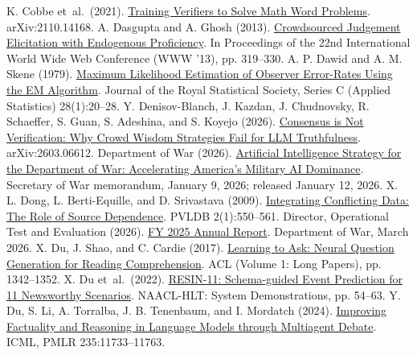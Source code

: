 \begin{thebibliography}{}
 K. Cobbe et~al.\ (2021). \href{https://arxiv.org/abs/2110.14168}{Training Verifiers to Solve Math Word Problems}. arXiv:2110.14168.
 A. Dasgupta and A. Ghosh (2013). \href{https://doi.org/10.1145/2488388.2488417}{Crowdsourced Judgement Elicitation with Endogenous Proficiency}. In Proceedings of the 22nd International World Wide Web Conference (WWW '13), pp. 319--330.
 A. P. Dawid and A. M. Skene (1979). \href{https://doi.org/10.2307/2346806}{Maximum Likelihood Estimation of Observer Error-Rates Using the EM Algorithm}. Journal of the Royal Statistical Society, Series C (Applied Statistics) 28(1):20--28.
 Y. Denisov-Blanch, J. Kazdan, J. Chudnovsky, R. Schaeffer, S. Guan, S. Adeshina, and S. Koyejo (2026). \href{https://arxiv.org/abs/2603.06612}{Consensus is Not Verification: Why Crowd Wisdom Strategies Fail for LLM Truthfulness}. arXiv:2603.06612.
 Department of War (2026). \href{https://www.war.gov/News/Releases/Release/Article/4376420/}{Artificial Intelligence Strategy for the Department of War: Accelerating America's Military AI Dominance}. Secretary of War memorandum, January 9, 2026; released January 12, 2026.
 X. L. Dong, L. Berti-Equille, and D. Srivastava (2009). \href{https://doi.org/10.14778/1687627.1687689}{Integrating Conflicting Data: The Role of Source Dependence}. PVLDB 2(1):550--561.
 Director, Operational Test and Evaluation (2026). \href{https://www.dote.osd.mil/Portals/97/pub/reports/FY2025/Other/2025Annual-Report.pdf}{FY 2025 Annual Report}. Department of War, March 2026.
 X. Du, J. Shao, and C. Cardie (2017). \href{https://doi.org/10.18653/v1/P17-1123}{Learning to Ask: Neural Question Generation for Reading Comprehension}. ACL (Volume 1: Long Papers), pp. 1342--1352.
 X. Du et~al.\ (2022). \href{https://doi.org/10.18653/v1/2022.naacl-demo.7}{RESIN-11: Schema-guided Event Prediction for 11 Newsworthy Scenarios}. NAACL-HLT: System Demonstrations, pp. 54--63.
 Y. Du, S. Li, A. Torralba, J. B. Tenenbaum, and I. Mordatch (2024). \href{https://proceedings.mlr.press/v235/du24e.html}{Improving Factuality and Reasoning in Language Models through Multiagent Debate}. ICML, PMLR 235:11733--11763.

\end{thebibliography}
